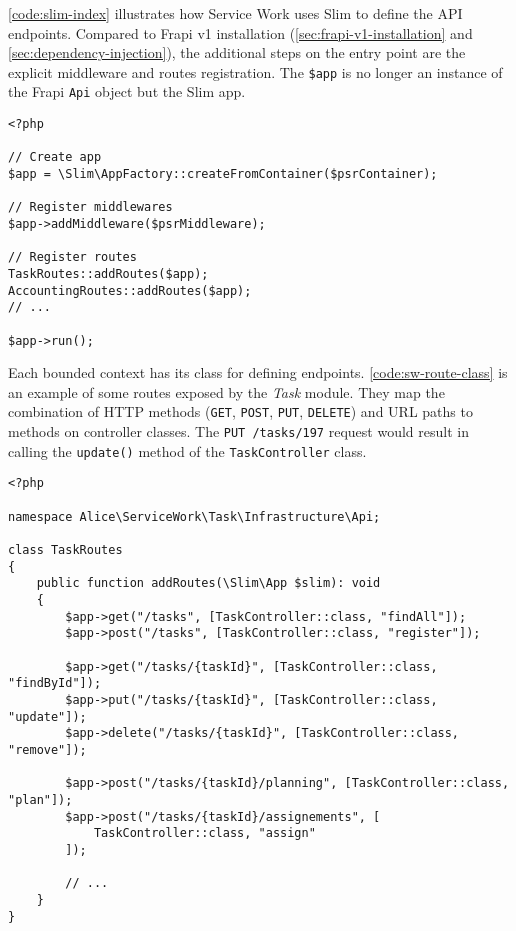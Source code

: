 \autoref{code:slim-index} illustrates how Service Work uses Slim to define the API endpoints. Compared to Frapi v1 installation (\autoref{sec:frapi-v1-installation} and \autoref{sec:dependency-injection}), the additional steps on the entry point are the explicit middleware and routes registration. The \texttt{\$app} is no longer an instance of the Frapi \texttt{Api} object but the Slim app.

\begin{listing}[htbp]
\begin{verbatim}
<?php

// Create app
$app = \Slim\AppFactory::createFromContainer($psrContainer);

// Register middlewares
$app->addMiddleware($psrMiddleware);

// Register routes
TaskRoutes::addRoutes($app);
AccountingRoutes::addRoutes($app);
// ...

$app->run();
\end{verbatim}
\caption{API entry point script without Frapi.}
\label{code:slim-index}
\end{listing}

Each bounded context has its class for defining endpoints. \autoref{code:sw-route-class} is an example of some routes exposed by the \textit{Task} module. They map the combination of HTTP methods (\texttt{GET}, \texttt{POST}, \texttt{PUT}, \texttt{DELETE}) and URL paths to methods on controller classes. The \texttt{PUT /tasks/197} request would result in calling the \texttt{update()} method of the \texttt{TaskController} class.

\begin{listing}[htbp]
\begin{verbatim}
<?php

namespace Alice\ServiceWork\Task\Infrastructure\Api;

class TaskRoutes
{
	public function addRoutes(\Slim\App $slim): void
	{
		$app->get("/tasks", [TaskController::class, "findAll"]);
        $app->post("/tasks", [TaskController::class, "register"]);
        
        $app->get("/tasks/{taskId}", [TaskController::class, "findById"]);
        $app->put("/tasks/{taskId}", [TaskController::class, "update"]);
        $app->delete("/tasks/{taskId}", [TaskController::class, "remove"]);

		$app->post("/tasks/{taskId}/planning", [TaskController::class, "plan"]);
		$app->post("/tasks/{taskId}/assignements", [
            TaskController::class, "assign"
        ]);

		// ...
	}
}
\end{verbatim}
\caption{HTTP route definitions for the \texttt{Task} bounded context.}
\label{code:sw-route-class}
\end{listing}

